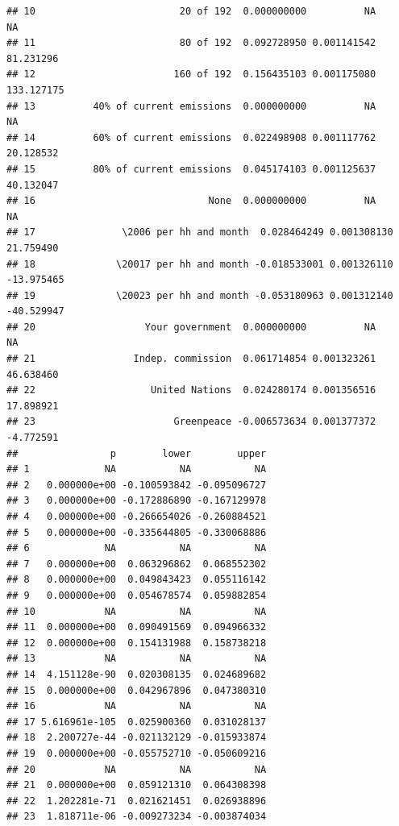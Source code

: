 \documentclass[a4paper,12pt]{article}\usepackage[]{graphicx}\usepackage[]{color}
\makeatletter
\newenvironment{kframe}{%
 \def\at@end@of@kframe{}%
 \ifinner\ifhmode%
  \def\at@end@of@kframe{\end{minipage}}%
  \begin{minipage}{\columnwidth}%
 \fi\fi%
 \def\FrameCommand##1{\hskip\@totalleftmargin \hskip-\fboxsep
 \colorbox{shadecolor}{##1}\hskip-\fboxsep
     \hskip-\linewidth \hskip-\@totalleftmargin \hskip\columnwidth}%
 \MakeFramed {\advance\hsize-\width
   \@totalleftmargin\z@ \linewidth\hsize
   \@setminipage}}%
 {\par\unskip\endMakeFramed%
 \at@end@of@kframe}
\newenvironment{knitrout}{}{} %
\makeatother
\begin{document}
\begin{knitrout}
\begin{kframe}
\begin{verbatim}
## 10                         20 of 192  0.000000000          NA          NA
## 11                         80 of 192  0.092728950 0.001141542   81.231296
## 12                        160 of 192  0.156435103 0.001175080  133.127175
## 13          40% of current emissions  0.000000000          NA          NA
## 14          60% of current emissions  0.022498908 0.001117762   20.128532
## 15          80% of current emissions  0.045174103 0.001125637   40.132047
## 16                              None  0.000000000          NA          NA
## 17               \2006 per hh and month  0.028464249 0.001308130   21.759490
## 18              \20017 per hh and month -0.018533001 0.001326110  -13.975465
## 19              \20023 per hh and month -0.053180963 0.001312140  -40.529947
## 20                   Your government  0.000000000          NA          NA
## 21                 Indep. commission  0.061714854 0.001323261   46.638460
## 22                    United Nations  0.024280174 0.001356516   17.898921
## 23                        Greenpeace -0.006573634 0.001377372   -4.772591
##                p        lower        upper
## 1             NA           NA           NA
## 2   0.000000e+00 -0.100593842 -0.095096727
## 3   0.000000e+00 -0.172886890 -0.167129978
## 4   0.000000e+00 -0.266654026 -0.260884521
## 5   0.000000e+00 -0.335644805 -0.330068886
## 6             NA           NA           NA
## 7   0.000000e+00  0.063296862  0.068552302
## 8   0.000000e+00  0.049843423  0.055116142
## 9   0.000000e+00  0.054678574  0.059882854
## 10            NA           NA           NA
## 11  0.000000e+00  0.090491569  0.094966332
## 12  0.000000e+00  0.154131988  0.158738218
## 13            NA           NA           NA
## 14  4.151128e-90  0.020308135  0.024689682
## 15  0.000000e+00  0.042967896  0.047380310
## 16            NA           NA           NA
## 17 5.616961e-105  0.025900360  0.031028137
## 18  2.200727e-44 -0.021132129 -0.015933874
## 19  0.000000e+00 -0.055752710 -0.050609216
## 20            NA           NA           NA
## 21  0.000000e+00  0.059121310  0.064308398
## 22  1.202281e-71  0.021621451  0.026938896
## 23  1.818711e-06 -0.009273234 -0.003874034
\end{verbatim}
\end{kframe}
\end{knitrout}
\end{document}

